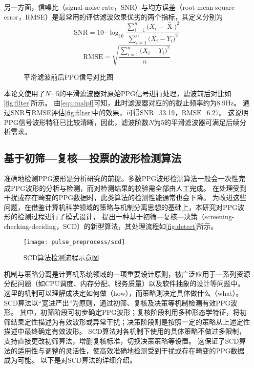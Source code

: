 另一方面，信噪比（signal-noise rate，SNR）与均方误差（root mean square error，RMSE）是最常用的评估滤波效果优劣的两个指标，其定义分别为
\begin{equation}
    \label{equ:snr}
    \text{SNR}=10 \cdot \log_{10}\frac{\sum_{i=1}^{n}{(X_i-\mathop{X} \limits^-})^2}{\sum_{i=1}^{n}{(X_i-Y_i})^2}
\end{equation}
\begin{equation}
    \label{equ:rmse}
    \text{RMSE}=\sqrt{\frac{\sum_{i=1}^{n}{(X_i-Y_i})^2}{n}}
\end{equation}

\begin{figure}[htbp]
    \centering
    \quad
    \caption{\label{fig:filter}平滑滤波前后PPG信号对比图}
\end{figure}

本论文使用了$N$=5的平滑滤波器对原始PPG信号进行处理，滤波前后对比如\autoref{fig:filter}所示。
由\autoref{equ:malpf}可知，此时滤波器对应的的截止频率约为8.9Hz。
通过SNR与RMSE评估\autoref{fig:filter}中的效果，可得$\text{SNR}$=33.19，$\text{RMSE}$=6.27。
这说明PPG信号波形特征已比较清晰，因此，滤波阶数$N$为5的平滑滤波器可满足后续分析需求。

\subsection{基于初筛—复核—投票的波形检测算法}
准确地检测PPG波形是分析研究的前提。多数PPG波形检测算法一般会一次性完成PPG波形的分析与检测，而对检测结果的校验需全部由人工完成\cite{Zhang2010,Allen2007,Feng2018,FengJiang2018}。
在处理受到干扰或存在畸变的PPG数据时，此类算法的检测性能通常也会下降。
为改进这些问题，在借鉴计算机科学领域的策略与机制分离思想的基础上\cite{Levin1975}，本研究对PPG波形的检测过程进行了模式设计，
提出一种基于初筛—复核—决策（screening-checking-deciding，SCD）的新型算法，其处理流程如\autoref{fig:detect}所示。

\begin{figure}[htbp]
    \centering
    \texttt{[image: pulse\_preprocess/scd]}
    \caption{\label{fig:detect}SCD算法检测流程示意图}
\end{figure}

机制与策略分离是计算机系统领域的一项重要设计原则，被广泛应用于一系列资源分配问题（如CPU调度、内存分配、服务质量）以及软件抽象的设计等问题中\cite{Levin1975}。
这里的机制可以理解成决定如何做（how），而策略则决定具体做什么（what）。
SCD算法以“宽进严出”为原则，通过初筛、复核及决策等机制检测有效PPG波形。
其中，初筛阶段可初步确定PPG波形；复核阶段利用多种形态学特征，将初筛结果定性描述为有效波形或异常干扰；决策阶段则是按照一定的策略从上述定性描述中最终确定有效波形。
SCD算法对各机制下使用的具体策略不做过多限制，支持直接更改初筛算法，增删复核标准，切换决策策略等设置。
这保证了SCD算法的适用性与调整的灵活性，使高效准确地检测受到干扰或存在畸变的PPG数据成为可能。
以下是对SCD算法的详细介绍。

